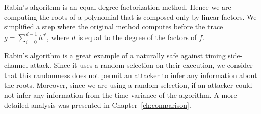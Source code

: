 Rabin's algorithm is an equal degree factorization method. Hence we are computing the roots of a polynomial that is composed only by linear factors. We simplified a step where the original method computes before the trace $g = \sum_{i=0}^{d-1} h^{q^{i}}$, where $d$ is equal to the degree of the factors of $f$. 

Rabin's algorithm is a great example of a naturally safe against timing side-channel attack. Since it uses a random selection on their execution, we consider that this randomness does not permit an attacker to infer any information about the roots. Moreover, since we are using a random selection, if an attacker could not infer any information from the time variance of the algorithm. A more detailed analysis was presented in Chapter~\ref{ch:comparison}.
